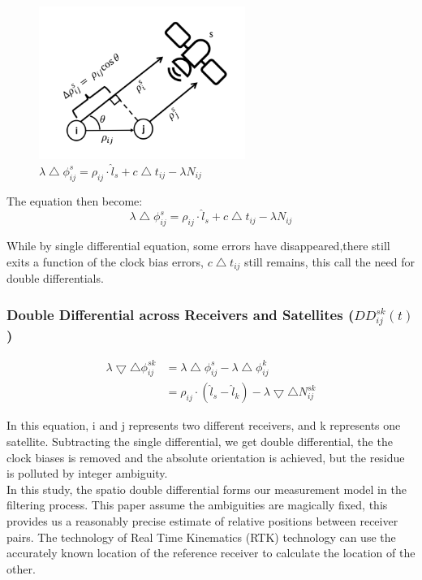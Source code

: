 \documentclass[journal,onecolumn]{IEEEtran}
\begin{document}
\begin{figure}
  \centering
  \captionsetup{justification=centering}
  \includegraphics[width=0.6\textwidth]{fig/sdrx.png}
  \caption{$\lambda \bigtriangleup \phi_{ij}^s = \rho_{ij}\cdot \hat{l}_s + c\bigtriangleup t_{ij} - \lambda N_{ij}$}
  \label{sdrx}
\end{figure}

The equation then become:
\begin{equation}
  \lambda \bigtriangleup \phi_{ij}^s = \rho_{ij}\cdot \hat{l}_s + c\bigtriangleup t_{ij} - \lambda N_{ij}
\end{equation}

While by single differential equation, some errors have disappeared,there still exits a function of the clock bias errors, $c\bigtriangleup t_{ij}$ still remains, this call the need for double differentials.

\subsubsection{Double Differential across Receivers and Satellites ($DD_{ij}^{sk}(t)$)}
\begin{equation}
  \begin{split}
    \lambda \bigtriangledown \bigtriangleup \phi_{ij}^{sk}
    &= \lambda \bigtriangleup \phi_{ij}^s - \lambda \bigtriangleup \phi_{ij}^k\\
    &= \rho_{ij}\cdot (\hat{l}_s-\hat{l}_k) - \lambda \bigtriangledown \bigtriangleup N_{ij}^{sk}
  \end{split}
\end{equation}

In this equation, i and j represents two different receivers, and k represents one satellite.
Subtracting the single differential, we get double differential, the the clock biases is removed and the absolute orientation
is achieved, but the residue is polluted by integer ambiguity. \\
In this study, the spatio double differential
forms our measurement model in the filtering process. This paper assume the ambiguities are magically fixed, this provides us a reasonably precise estimate of relative positions between receiver pairs. The technology of Real Time Kinematics (RTK) technology can use the accurately known location of the reference receiver to calculate the location of the other.
\end{document}
